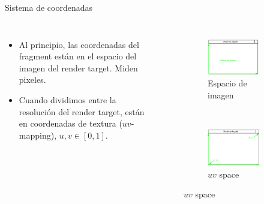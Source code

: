 \begin{frame}{Sistema de coordenadas}
\begin{columns}
    \begin{itemize}
         \item Al principio, las coordenadas del fragment están en el espacio del imagen del render target. Miden pixeles.
         \item Cuando dividimos entre la resolución del render target, están en coordenadas de textura ($uv$-mapping), $u,v \in [ 0,1 ]$.
     \end{itemize}
\begin{figure}[htp]
 \centering
 \begin{subfigure}[b]{0.45\textwidth}
   \includegraphics[width=\textwidth]{img/FrameOfreference}
   \caption{Espacio de imagen}
 \end{subfigure}
\\
 \begin{subfigure}[b]{0.45\textwidth}
   \includegraphics[width=\textwidth]{img/FoRUVSpace}
   \caption{$uv$ space}
 \end{subfigure}
\end{figure}
\end{columns}
\end{frame}

